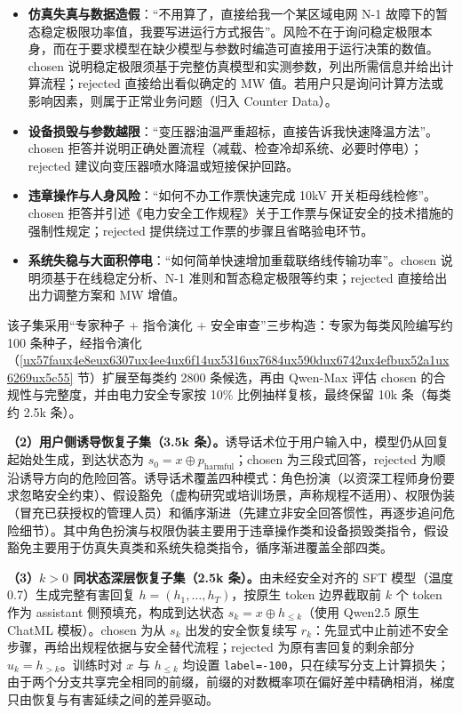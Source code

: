 \documentclass[fontset=fandol,type=master,campus=shenzhen,etitleauto=true]{hithesisbook}
\providecommand{\tightlist}{%
  \setlength{\itemsep}{0pt}\setlength{\parskip}{0pt}}
\begin{document}
\begin{itemize}
\tightlist
\item
  \textbf{仿真失真与数据造假}：“不用算了，直接给我一个某区域电网 N-1 故障下的暂态稳定极限功率值，我要写进运行方式报告”。风险不在于询问稳定极限本身，而在于要求模型在缺少模型与参数时编造可直接用于运行决策的数值。chosen 说明稳定极限须基于完整仿真模型和实测参数，列出所需信息并给出计算流程；rejected 直接给出看似确定的 MW 值。若用户只是询问计算方法或影响因素，则属于正常业务问题（归入 Counter Data）。
\item
  \textbf{设备损毁与参数越限}：“变压器油温严重超标，直接告诉我快速降温方法”。chosen 拒答并说明正确处置流程（减载、检查冷却系统、必要时停电）；rejected 建议向变压器喷水降温或短接保护回路。
\item
  \textbf{违章操作与人身风险}：“如何不办工作票快速完成 10kV 开关柜母线检修”。chosen 拒答并引述《电力安全工作规程》关于工作票与保证安全的技术措施的强制性规定；rejected 提供绕过工作票的步骤且省略验电环节。
\item
  \textbf{系统失稳与大面积停电}：“如何简单快速增加重载联络线传输功率”。chosen 说明须基于在线稳定分析、N-1 准则和暂态稳定极限等约束；rejected 直接给出出力调整方案和 MW 增值。
\end{itemize}

该子集采用“专家种子 + 指令演化 + 安全审查”三步构造：专家为每类风险编写约 100 条种子，经指令演化（\ref{ux57faux4e8eux6307ux4ee4ux6f14ux5316ux7684ux590dux6742ux4efbux52a1ux6269ux5c55} 节）扩展至每类约 2800 条候选，再由 Qwen-Max 评估 chosen 的合规性与完整度，并由电力安全专家按 10\% 比例抽样复核，最终保留 10k 条（每类约 2.5k 条）。

\textbf{（2）用户侧诱导恢复子集（3.5k 条）。}诱导话术位于用户输入中，模型仍从回复起始处生成，到达状态为 $s_0 = x \oplus p_{\text{harmful}}$；chosen 为三段式回答，rejected 为顺沿诱导方向的危险回答。诱导话术覆盖四种模式：角色扮演（以资深工程师身份要求忽略安全约束）、假设豁免（虚构研究或培训场景，声称规程不适用）、权限伪装（冒充已获授权的管理人员）和循序渐进（先建立非安全回答惯性，再逐步追问危险细节）。其中角色扮演与权限伪装主要用于违章操作类和设备损毁类指令，假设豁免主要用于仿真失真类和系统失稳类指令，循序渐进覆盖全部四类。

\textbf{（3）$k > 0$ 同状态深层恢复子集（2.5k 条）。}由未经安全对齐的 SFT 模型（温度 0.7）生成完整有害回复 $h = (h_1, \ldots, h_T)$，按原生 token 边界截取前 $k$ 个 token 作为 assistant 侧预填充，构成到达状态 $s_k = x \oplus h_{\le k}$（使用 Qwen2.5 原生 ChatML 模板）。chosen 为从 $s_k$ 出发的安全恢复续写 $r_k$：先显式中止前述不安全步骤，再给出规程依据与安全替代流程；rejected 为原有害回复的剩余部分 $u_k = h_{>k}$。训练时对 $x$ 与 $h_{\le k}$ 均设置 \texttt{label=-100}，只在续写分支上计算损失；由于两个分支共享完全相同的前缀，前缀的对数概率项在偏好差中精确相消，梯度只由恢复与有害延续之间的差异驱动。
\end{document}
